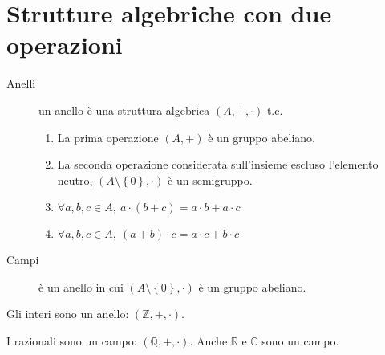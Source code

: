 

\section{Strutture algebriche con due operazioni}

\begin{description}
    \item[Anelli] un anello \`e una struttura algebrica $(A, +, \cdot)$ t.c. 
    \begin{enumerate}
        \item La prima operazione $\left( A, + \right )$ \`e un gruppo abeliano.
        \item La seconda operazione considerata sull'insieme escluso l'elemento neutro, $(A \setminus \left \{ 0 \right \}, \cdot )$ \`e un semigruppo.
        \item $ \forall a, b, c \in A , \ a \cdot (b + c) = a \cdot b + a \cdot c $
        \item $ \forall a, b, c \in A , \ (a + b) \cdot c = a \cdot c + b \cdot c $
    \end{enumerate}
    \item[Campi] \`e un anello in cui $( A \setminus \left \{ 0 \right \}, \cdot )$ \`e un gruppo abeliano.
\end{description}

Gli interi sono un anello: $\left ( \mathbb{Z}, +, \cdot \right )$.

I razionali sono un campo: $\left ( \mathbb{Q}, +, \cdot \right )$. Anche $\mathbb{R}$ e $\mathbb{C}$ sono un campo.